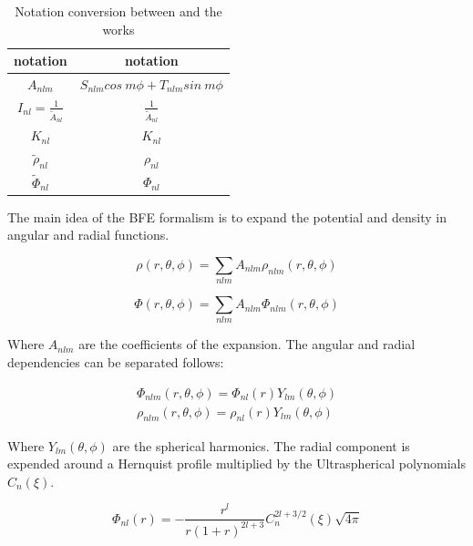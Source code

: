 \documentclass[14pt]{article}
\begin{document}
\begin{table}[h]
  \centering
  \begin{tabular}{c  c}
    \hline
    \hline
    \cite{Hernquist92} notation & \cite{Lowing11} notation \\
    \hline
    $A_{nlm}$ & $S_{nlm} cos\ m\phi + T_{nlm}sin\ m\phi $\\
    $I_{nl} = \frac{1}{\tilde{A}_{nl}}$ & $\frac{1}{\tilde{A}_{nl}}$\\
    $K_{nl}$ & $K_{nl}$ \\
    $\tilde{\rho}_{nl}$ & $\rho_{nl}$\\
    $\tilde{\Phi}_{nl}$ & $\Phi_{nl}$\\
    \hline
    \hline
  \end{tabular}
  \caption{Notation conversion between \cite{Hernquist92} and the
  \cite{Lowing11} works}\label{tab:conversion}
\end{table}



The main idea of the BFE formalism is to expand the potential and density in
angular and radial functions. 


\begin{equation}
    \rho(r, \theta, \phi) = \sum_{nlm} A_{nlm}\rho_{nlm}(r, \theta, \phi)
\end{equation}

\begin{equation}
    \Phi(r, \theta, \phi) = \sum_{nlm} A_{nlm}\Phi_{nlm}(r, \theta, \phi)
\end{equation}

Where $A_{nlm}$ are the coefficients of the expansion. The angular and radial
dependencies can be separated follows:


\begin{equation}\label{eq:potdens_nlm}
  \begin{aligned}
  \Phi_{nlm}(r, \theta, \phi) = \Phi_{nl}(r)Y_{lm}(\theta, \phi)\\ 
  \rho_{nlm}(r, \theta, \phi) = \rho_{nl}(r)Y_{lm}(\theta, \phi) 
  \end{aligned}
\end{equation}


Where $Y_{lm}(\theta,\phi)$ are the spherical harmonics. The radial component
is expended around a Hernquist profile multiplied by the Ultraspherical
polynomials $C_{n}(\xi)$.


\begin{equation}
  \Phi_{nl}(r) = - \dfrac{r^l}{r(1+r)^{2l+3}}C_{n}^{2l+3/2}(\xi)\sqrt{4\pi}
\end{equation}
\end{document}
